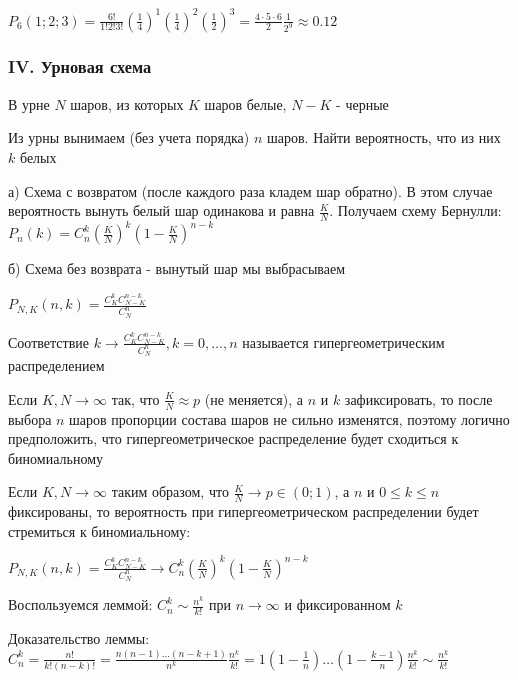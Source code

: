 \documentclass[12pt]{article}
\begin{document}
    $P_6(1; 2; 3) = \frac{6!}{1!2!3!} \left(\frac{1}{4}\right)^1 \left(\frac{1}{4}\right)^2 \left(\frac{1}{2}\right)^3 = \frac{4 \cdot 5 \cdot 6}{2} \frac{1}{2^9} \approx 0.12$

    \subsubsection{IV. Урновая схема}

    В урне $N$ шаров, из которых $K$ шаров белые, $N - K$ - черные

    Из урны вынимаем (без учета порядка) $n$ шаров. Найти вероятность, что из них $k$ белых

    а) Схема с возвратом (после каждого раза кладем шар обратно). В этом случае вероятность вынуть белый шар одинакова и
    равна $\frac{K}{N}$. Получаем схему Бернулли: $P_n(k) = C^k_n \left(\frac{K}{N}\right)^k \left(1 - \frac{K}{N}\right)^{n - k}$

    б) Схема без возврата - вынутый шар мы выбрасываем

    $P_{N, K} (n, k) = \frac{C^k_K C^{n - k}_{N - K}}{C^n_N}$

    \Def Соответствие $k \rightarrow \frac{C^k_K C^{n - k}_{N - K}}{C^n_N}, k = 0, \dots, n$ называется гипергеометрическим
    распределением

    \Nota Если $K, N \to \infty$ так, что $\frac{K}{N} \approx p$ (не меняется), а $n$ и $k$ зафиксировать, то после выбора
    $n$ шаров пропорции состава шаров не сильно изменятся, поэтому логично предположить, что гипергеометрическое распределение
    будет сходиться к биномиальному

    \begin{MyTheorem}
        \Ths Если $K, N \to \infty$ таким образом, что $\frac{K}{N} \to p \in (0;1)$, а $n$ и $0 \leq k \leq n$ фиксированы, то
        вероятность при гипергеометрическом распределении будет стремиться к биномиальному:

        $P_{N,K} (n, k) = \frac{C^k_K C^{n - k}_{N - K}}{C^n_N} \rightarrow C^k_n \left(\frac{K}{N}\right)^k \left(1 - \frac{K}{N}\right)^{n - k}$
    \end{MyTheorem}

    Воспользуемся леммой: $C^k_n \sim \frac{n^k}{k!}$ при $n \to \infty$ и фиксированном $k$

    Доказательство леммы: $C_n^k = \frac{n!}{k!(n - k)!} = \frac{n(n - 1) \dots (n - k + 1)}{n^k} \frac{n^k}{k!} = 1 \left(1 - \frac{1}{n}\right) \dots \left(1 - \frac{k - 1}{n}\right) \frac{n^k}{k!} \sim \frac{n^k}{k!}$
\end{document}
